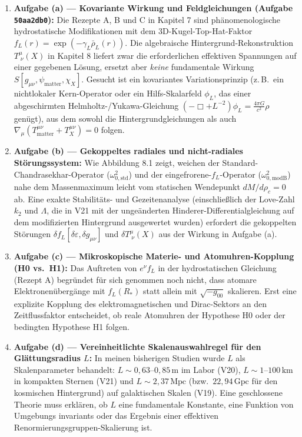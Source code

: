\documentclass[10pt,a4paper]{article}
\begin{document}
\begin{enumerate}\setlength{\itemsep}{2.5pt}\setlength{\parskip}{0pt}\setlength{\topsep}{2pt}
  \item \textbf{Aufgabe (a) --- Kovariante Wirkung und Feldgleichungen (Aufgabe \texttt{50aa2db0}):}
  Die Rezepte A, B und C in Kapitel 7 sind ph\"anomenologische hydrostatische Modifikationen mit dem 3D-Kugel-Top-Hat-Faktor $f_L(r) = \exp(-\gamma_L\bar{\rho}_L(r))$. Die algebraische Hintergrund-Rekonstruktion $T^\mu_{\;\nu}(X)$ in Kapitel 8 liefert zwar die erforderlichen effektiven Spannungen auf einer gegebenen L\"osung, ersetzt aber \emph{keine} fundamentale Wirkung $S[g_{\mu\nu}, \psi_{\text{matter}}, \chi_X]$. Gesucht ist ein kovariantes Variationsprinzip (z.\,B.\ ein nichtlokaler Kern-Operator oder ein Hilfs-Skalarfeld $\phi_L$, das einer abgeschirmten Helmholtz-/Yukawa-Gleichung $(-\Box + L^{-2})\phi_L = \frac{4\pi G}{c^2}\rho$ gen\"ugt), aus dem sowohl die Hintergrundgleichungen als auch $\nabla_\mu(T^{\mu\nu}_{\text{matter}} + T^{\mu\nu}_X) = 0$ folgen.
  \item \textbf{Aufgabe (b) --- Gekoppeltes radiales und nicht-radiales St\"orungssystem:}
  Wie Abbildung 8.1 zeigt, weichen der Standard-Chandrasekhar-Operator ($\omega_{0,\text{std}}^2$) und der eingefrorene-$f_L$-Operator ($\omega_{0,\text{modB}}^2$) nahe dem Massenmaximum leicht vom statischen Wendepunkt $dM/d\rho_c = 0$ ab. Eine exakte Stabilit\"ats- und Gezeitenanalyse (einschlie\ss lich der Love-Zahl $k_2$ und $\Lambda$, die in V21 mit der unge\"anderten Hinderer-Differentialgleichung auf dem modifizierten Hintergrund ausgewertet wurden) erfordert die gekoppelten St\"orungen $\delta f_L[\delta\varepsilon, \delta g_{\mu\nu}]$ und $\delta T^\mu_{\;\nu}(X)$ aus der Wirkung in Aufgabe (a).
  \item \textbf{Aufgabe (c) --- Mikroskopische Materie- und Atomuhren-Kopplung (H0 vs.\ H1):}
  Das Auftreten von $e^\nu f_L$ in der hydrostatischen Gleichung (Rezept A) begr\"undet f\"ur sich genommen noch nicht, dass atomare Elektronen\"uberg\"ange mit $f_L(R_*)$ statt allein mit $\sqrt{-g_{00}}$ skalieren. Erst eine explizite Kopplung des elektromagnetischen und Dirac-Sektors an den Zeitflussfaktor entscheidet, ob reale Atomuhren der Hypothese H0 oder der bedingten Hypothese H1 folgen.
  \item \textbf{Aufgabe (d) --- Vereinheitlichte Skalenauswahlregel f\"ur den Gl\"attungsradius $L$:}
  In meinen bisherigen Studien wurde $L$ als Skalenparameter behandelt: $L \sim 0{,}63\text{--}0{,}85\,\text{m}$ im Labor (V20), $L \sim 1\text{--}100\,\text{km}$ in kompakten Sternen (V21) und $L \sim 2{,}37\,\text{Mpc}$ (bzw.\ $22{,}94\,\text{Gpc}$ f\"ur den kosmischen Hintergrund) auf galaktischen Skalen (V19). Eine geschlossene Theorie muss erkl\"aren, ob $L$ eine fundamentale Konstante, eine Funktion von Umgebungs invariants oder das Ergebnis einer effektiven Renormierungsgruppen-Skalierung ist.
\end{enumerate}
\end{document}
